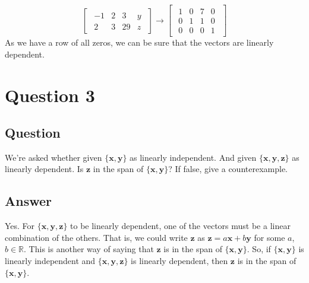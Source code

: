 \documentclass{article}
\begin{document}
\begin{description}
\[\begin{bmatrix}
\begin{array}{ccc|c}
                        -1 & 2  & 3 & y \\
                        2  & 3  & 29 & z
                    \end{array}
                    \end{bmatrix}
                    \rightarrow
                    \begin{bmatrix}
                    \begin{array}{ccc|c}
                        1 & 0 & 7 & 0 \\
                        0 & 1 & 1 & 0 \\
                        0 & 0 & 0 & 1
                    \end{array}
                    \end{bmatrix}
                    \]
                    As we have a row of all zeros, we can be sure that the vectors are linearly dependent.

            \end{description}
    \section{Question 3}
        \subsection{Question}
            We're asked whether given $\{\mathbf{x}, \mathbf{y}\}$ as linearly independent.
            And given $\{\mathbf{x}, \mathbf{y}, \mathbf{z}\}$ as linearly dependent.
            Is $\mathbf{z}$ in the span of $\{\mathbf{x}, \mathbf{y}\}$?
            If false, give a counterexample.
        \subsection{Answer}
            Yes. For $\{\mathbf{x}, \mathbf{y}, \mathbf{z}\}$ to be linearly dependent,
            one of the vectors must be a linear combination of the others.
            That is, we could write $\mathbf{z}$ as $\mathbf{z} = a\mathbf{x} + b\mathbf{y}$
            for some $a$, $b \in \mathbb{R}$.
            This is another way of saying that $\mathbf{z}$ is in the span of $\{\mathbf{x}, \mathbf{y}\}$.
            So, if $\{\mathbf{x}, \mathbf{y}\}$ is linearly independent
            and $\{\mathbf{x}, \mathbf{y}, \mathbf{z}\}$ is linearly dependent,
            then $\mathbf{z}$ is in the span of $\{\mathbf{x}, \mathbf{y}\}$.
\end{document}
